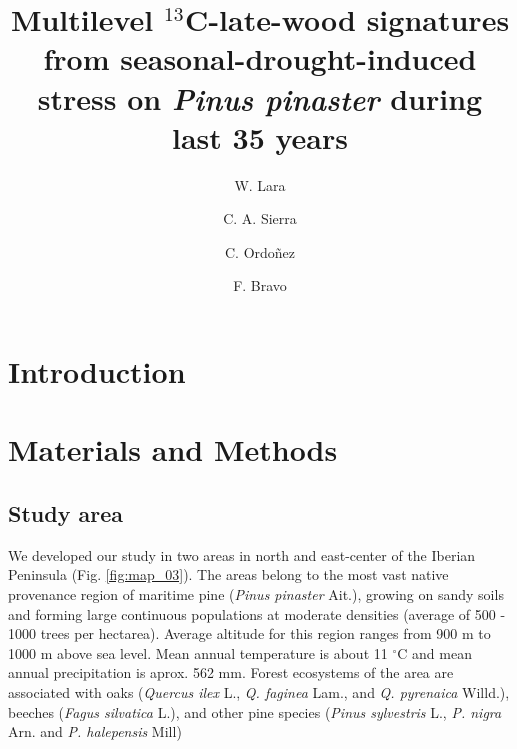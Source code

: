 \documentclass[review,authoryear]{elsarticle}
\begin{document}
\begin{frontmatter}
\title{\textbf{Multilevel $^{13}$C-late-wood signatures from seasonal-drought-induced
    stress on \textit{Pinus pinaster} during last 35 years }}

\author[aut1,aut2]{W. Lara}
\author[aut1]{C. A.  Sierra }
\author[aut1]{C. Ordo{\~n}ez}
\author[aut1]{F. Bravo}


\address[aut1]{Sustainable Forest Management Research
  Institute,UVA-INIA, Avenida Madrid, s/n, 34071, Palencia, Spain}

\address[focal]{Department of Biogeochemical Processes, Max Planck
  Institute for Biogeochemistry, Hans-Kn\"oll-Stra\ss e 10, 07745,
  Jena, Germany}

\address[aut2]{Research Center on Ecosystems and Global Change,
  Carbono \& Bosques $($C\&B$)$, Calle 51A, N$^o$ 72-23, Int: 601,
  050034, Medell{\'i}n, Colombia}

\begin{abstract}
\end{abstract}
\begin{keyword}
\end{keyword}
\end{frontmatter}

\linenumbers
\section{Introduction}\label{sec:intro}

\section{Materials and Methods}

\subsection{Study area}
We developed our study in two areas in north and east-center of the
Iberian Peninsula (Fig. \ref{fig:map_03}). The areas belong to the
most vast native provenance region of maritime pine (\textit{Pinus
  pinaster} Ait.), growing on sandy soils and forming large continuous
populations at moderate densities (average of 500 - 1000 trees per
hectarea).
Average altitude for this region ranges from 900 m to 1000 m above sea
level. Mean annual temperature is about 11 $^{\circ}$C and mean annual
precipitation is aprox. 562 mm. %
Forest ecosystems of the area are associated with oaks
(\textit{Quercus ilex} L., \textit{Q. faginea} Lam., and
\textit{Q. pyrenaica} Willd.), beeches (\textit{Fagus silvatica} L.),
and other pine species (\textit{Pinus sylvestris} L.,
\textit{P. nigra} Arn. and \textit{P.  halepensis} Mill)
\end{document}

